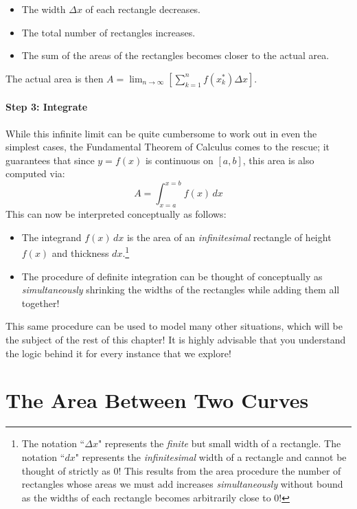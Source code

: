 \documentclass{ximera}
\begin{document}
\begin{itemize}
\item[1.] The width $\Delta x$ of each rectangle decreases.
\item[2.] The total number of rectangles increases.
\item[3.] The sum of the areas of the rectangles becomes closer to the actual area.
\end{itemize}

The actual area is then $A = \lim_{n \rightarrow \infty} \left[ \sum_{k=1}^n f(x_k^*) \Delta x \right]$.


\paragraph{Step 3: Integrate}

While this infinite limit can be quite cumbersome to work out in even the simplest cases, the Fundamental Theorem of Calculus comes to the rescue; it guarantees that since $y=f(x)$ is continuous on $[a,b]$, this area is also computed via: $$A = \int_{x=a}^{x=b} f(x) \, dx$$
This can now be interpreted conceptually as follows:
\begin{itemize}
\item[1.] The integrand $f(x) \, dx$ is the area of an \emph{infinitesimal} rectangle of height $f(x)$ and thickness $dx$.\footnote{The notation ``$\Delta x$" represents the \emph{finite} but small width of a rectangle.  The notation ``$dx$" represents the \emph{infinitesimal} width of a rectangle and cannot be thought of strictly as 0!  This results from the area procedure the number of rectangles whose areas we must add increases \emph{simultaneously} without bound as the widths of each rectangle becomes arbitrarily close to 0!}
\item[2.] The procedure of definite integration can be thought of conceptually as \emph{simultaneously} shrinking the widths of the rectangles while adding them all together!
\end{itemize}

This same procedure can be used to model many other situations, which will be the subject of the rest of this chapter!  It is highly advisable that you understand the logic behind it for every instance that we explore! 




\section{The Area Between Two Curves}
\end{document}
